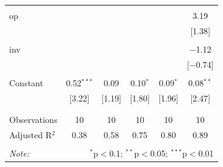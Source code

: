 \documentclass[12pt]{article}
\begin{document}
\begin{table}[!htbp]
\begin{tabular}{@{\extracolsep{5pt}}lccccc}
  & & & & & \\ 
 op &  &  &  &  & 3.19 \\ 
  &  &  &  &  & [1.38] \\ 
  & & & & & \\ 
 inv &  &  &  &  & $-$1.12 \\ 
  &  &  &  &  & [$-$0.74] \\ 
  & & & & & \\ 
 Constant & 0.52$^{***}$ & 0.09 & 0.10$^{*}$ & 0.09$^{*}$ & 0.08$^{**}$ \\ 
  & [3.22] & [1.19] & [1.80] & [1.96] & [2.47] \\ 
  & & & & & \\ 
\hline \\[-1.8ex] 
Observations & 10 & 10 & 10 & 10 & 10 \\ 
Adjusted R$^{2}$ & 0.38 & 0.58 & 0.75 & 0.80 & 0.89 \\ 
\hline 
\hline \\[-1.8ex] 
\textit{Note:}  & \multicolumn{5}{r}{$^{*}$p$<$0.1; $^{**}$p$<$0.05; $^{***}$p$<$0.01} \\ 
\end{tabular}
\end{table} 



\clearpage
\end{document}
